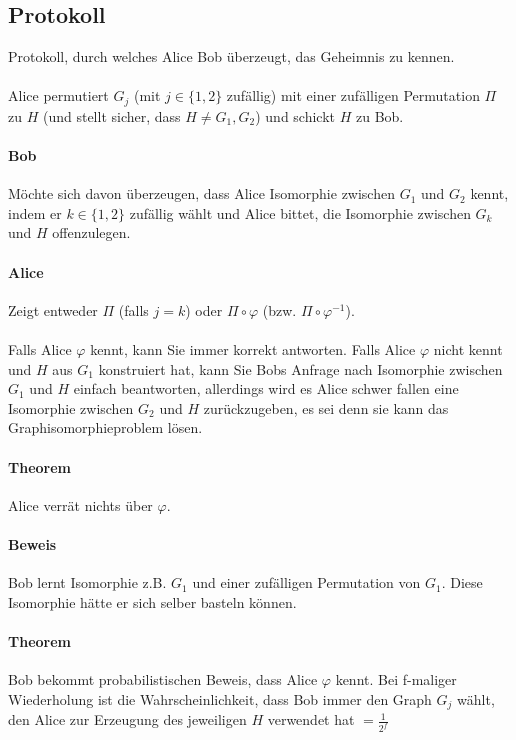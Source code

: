\subsection{Protokoll}
Protokoll, durch welches Alice Bob überzeugt, das Geheimnis zu kennen.

\paragraph*{} Alice permutiert $G_j$ (mit $j \in \{ 1,2 \}$ zufällig) mit einer zufälligen Permutation $\Pi$ zu $H$ (und stellt sicher, dass $H \not= G_1,G_2$) und schickt $H$ zu Bob.

\paragraph*{Bob} Möchte sich davon überzeugen, dass Alice Isomorphie zwischen $G_1$ und $G_2$ kennt, indem er $k \in \{ 1,2 \}$ zufällig wählt und Alice bittet, die Isomorphie zwischen $G_k$ und $H$ offenzulegen.

\paragraph*{Alice} Zeigt entweder $\Pi$ (falls $j=k$) oder $\Pi \circ \varphi$ (bzw. $\Pi \circ \varphi^{-1}$).


\paragraph*{} Falls Alice $\varphi$ kennt, kann Sie immer korrekt antworten. Falls Alice $\varphi$ nicht kennt und $H$ aus $G_1$ konstruiert hat, kann Sie Bobs Anfrage nach Isomorphie zwischen $G_1$ und $H$ einfach beantworten, allerdings wird es Alice schwer fallen eine Isomorphie zwischen $G_2$ und $H$ zurückzugeben, es sei denn sie kann das Graphisomorphieproblem lösen.

\paragraph*{Theorem} Alice verrät nichts über $\varphi$.

\paragraph*{Beweis} Bob lernt Isomorphie z.B. $G_1$ und einer zufälligen Permutation von $G_1$. Diese Isomorphie hätte er sich selber basteln können.

\paragraph*{Theorem} Bob bekommt probabilistischen Beweis, dass Alice $\varphi$ kennt. Bei f-maliger Wiederholung ist die Wahrscheinlichkeit, dass Bob immer den Graph $G_j$ wählt, den Alice zur Erzeugung des jeweiligen $H$ verwendet hat $= \frac{1}{2^f}$